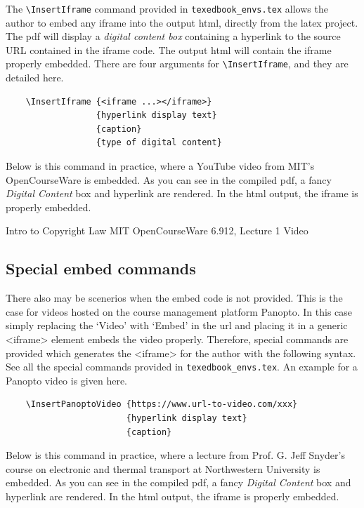 \documentclass{article}
\begin{document}
The \verb'\InsertIframe' command provided in \verb'texedbook_envs.tex' allows the author to embed any iframe into the output html, directly from the latex project. The pdf will display a \textit{digital content box} containing a hyperlink to the source URL contained in the iframe code. The output html will contain the iframe properly embedded. There are four arguments for \verb'\InsertIframe', and they are detailed here.
\begin{verbatim}
    \InsertIframe {<iframe ...></iframe>}
                  {hyperlink display text}
                  {caption}
                  {type of digital content}
\end{verbatim}  

Below is this command in practice, where a YouTube video from MIT's OpenCourseWare is embedded. As you can see in the compiled pdf, a fancy \textit{Digital Content} box and hyperlink are rendered. In the html output, the iframe is properly embedded.

             {Intro to Copyright Law}
             {MIT OpenCourseWare 6.912, Lecture 1}
             {Video} 

\subsection{Special embed commands}
There also may be scenerios when the embed code is not provided. This is the case for videos hosted on the course management platform Panopto. In this case simply replacing the `Video' with `Embed' in the url and placing it in a generic <iframe> element embeds the video properly. Therefore, special commands are provided which generates the <iframe> for the author with the following syntax. See all the special commands provided in \verb'texedbook_envs.tex'. An example for a Panopto video is given here.
\begin{verbatim}
    \InsertPanoptoVideo {https://www.url-to-video.com/xxx}
                        {hyperlink display text}
                        {caption}
\end{verbatim}  

Below is this command in practice, where a lecture from Prof. G. Jeff Snyder's course on electronic and thermal transport at Northwestern University is embedded. As you can see in the compiled pdf, a fancy \textit{Digital Content} box and hyperlink are rendered. In the html output, the iframe is properly embedded.
\end{document}
